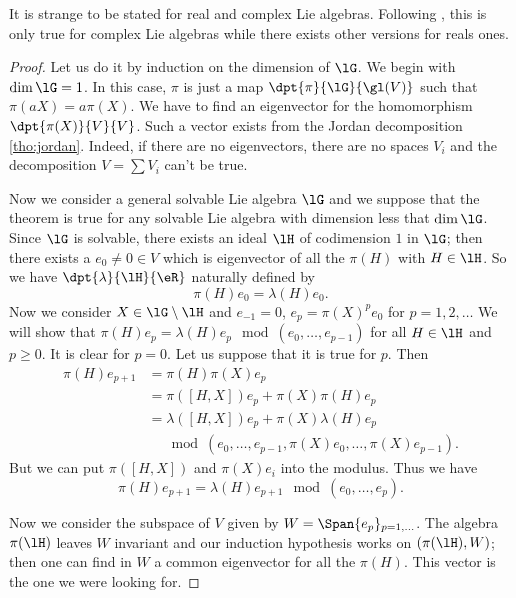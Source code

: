 \begin{probleme}
    It is strange to be stated for real and complex Lie algebras. Following \cite{SamelsonNotesLieAlg}, this is only true for complex Lie algebras while there exists other versions for reals ones.
\end{probleme}

\begin{proof}
Let us do it by induction on the dimension of $\lG$. We begin with $\dim\lG=1$. In this case, $\pi$ is just a map $\dpt{\pi}{\lG}{\gl(V)}$ such that $\pi(aX)=a\pi(X)$. We have to find an eigenvector for the homomorphism $\dpt{\pi(X)}{V}{V}$. Such a vector exists  from the Jordan decomposition \ref{tho:jordan}. Indeed, if there are no eigenvectors, there are no spaces $V_i$ and the decomposition $V=\sum V_i$ can't be true.

Now we consider a general solvable Lie algebra $\lG$ and we suppose that the theorem is true for any solvable Lie algebra with dimension less that $\dim\lG$. Since $\lG$ is solvable, there exists an ideal $\lH$ of codimension $1$ in $\lG$; then there exists a $e_0\neq 0\in V$ which is eigenvector of all the $\pi(H)$ with $H\in\lH$. So we have $\dpt{\lambda}{\lH}{\eR}$ naturally defined by
\[
  \pi(H)e_0=\lambda(H)e_0.
\]
Now we consider $X\in\lG\setminus\lH$ and $e_{-1}=0$, $e_p=\pi(X)^pe_0$ for $p=1,2,\ldots$ We will show that $\pi(H)e_p=\lambda(H)e_p\mod(e_0,\ldots,e_{p-1})$ for all $H\in\lH$ and $p\geq 0$. It is clear for $p=0$. Let us suppose that it is true for $p$. Then
\begin{equation}
\begin{split}
  \pi(H)e_{p+1}&=\pi(H)\pi(X)e_p\\
               &=\pi([H,X])e_p+\pi(X)\pi(H)e_p\\
           &=\lambda([H,X])e_p+\pi(X)\lambda(H)e_p\\
                      &\quad\mod(e_0,\ldots,e_{p-1},\pi(X)e_0,\ldots,\pi(X)e_{p-1}).
\end{split}
\end{equation}
But we can put $\pi([H,X])$ and $\pi(X)e_i$ into the modulus. Thus we have
\[
  \pi(H)e_{p+1}=\lambda(H)e_{p+1}\mod(e_0,\ldots,e_p).
\]

Now we consider the subspace of $V$ given by $W=\Span\{e_p\}_{p=1,\ldots}$. The algebra $\pi(\lH)$ leaves $W$ invariant and our induction hypothesis works on $(\pi(\lH),W)$; then one can find in $W$ a common eigenvector for all the $\pi(H)$. This vector is the one we were looking for.
\end{proof}

